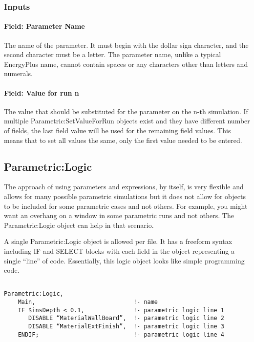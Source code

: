 \subsubsection{Inputs}\label{inputs-030}

\paragraph{Field: Parameter Name}\label{field-parameter-name}

The name of the parameter. It must begin with the dollar sign character, and the second character must be a letter. The parameter name, unlike a typical EnergyPlus name, cannot contain spaces or any characters other than letters and numerals.

\paragraph{Field: Value for run n}\label{field-value-for-run-n}

The value that should be substituted for the parameter on the n-th simulation. If multiple Parametric:SetValueForRun objects exist and they have different number of fields, the last field value will be used for the remaining field values. This means that to set all values the same, only the first value needed to be entered.

\subsection{Parametric:Logic}\label{parametriclogic}

The approach of using parameters and expressions, by itself, is very flexible and allows for many possible parametric simulations but it does not allow for objects to be included for some parametric cases and not others. For example, you might want an overhang on a window in some parametric runs and not others. The Parametric:Logic object can help in that scenario.

A single Parametric:Logic object is allowed per file. It has a freeform syntax including IF and SELECT blocks with each field in the object representing a single ``line'' of code. Essentially, this logic object looks like simple programming code.

\begin{lstlisting}

Parametric:Logic,
    Main,                            !- name
    IF $insDepth < 0.1,              !- parametric logic line 1
       DISABLE “MaterialWallBoard”,  !- parametric logic line 2
       DISABLE “MaterialExtFinish”,  !- parametric logic line 3
    ENDIF;                           !- parametric logic line 4
\end{lstlisting}

